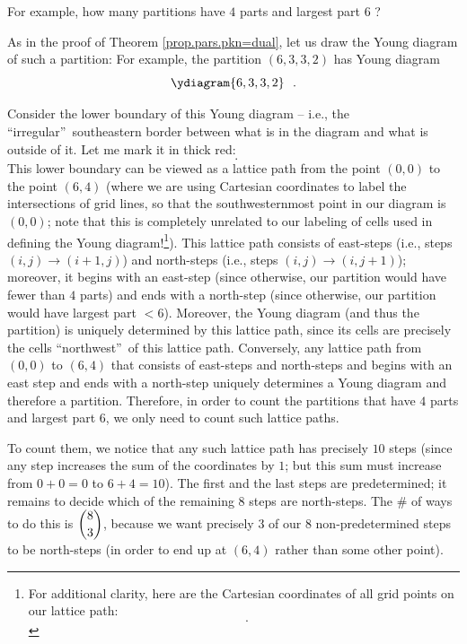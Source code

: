 For example, how many partitions have $4$ parts and largest part $6$ ?

As in the proof of Theorem \ref{prop.pars.pkn=dual}, let us draw the Young
diagram of such a partition: For example, the partition $\left(
6,3,3,2\right)  $ has Young diagram%
\[
\ydiagram{6,3,3,2}\ \ .
\]


Consider the lower boundary of this Young diagram -- i.e., the
\textquotedblleft irregular\textquotedblright\ southeastern border between
what is in the diagram and what is outside of it. Let me mark it in thick red:%
\[%
\ \ .
\]
This lower boundary can be viewed as a lattice path from the point $\left(
0,0\right)  $ to the point $\left(  6,4\right)  $ (where we are using
Cartesian coordinates to label the intersections of grid lines, so that the
southwesternmost point in our diagram is $\left(  0,0\right)  $; note that
this is completely unrelated to our labeling of cells used in defining the
Young diagram!\footnote{For additional clarity, here are the Cartesian
coordinates of all grid points on our lattice path:%
\[%
\ \ .
\]
}). This lattice path consists of east-steps (i.e., steps $\left(  i,j\right)
\rightarrow\left(  i+1,j\right)  $) and north-steps (i.e., steps $\left(
i,j\right)  \rightarrow\left(  i,j+1\right)  $); moreover, it begins with an
east-step (since otherwise, our partition would have fewer than $4$ parts) and
ends with a north-step (since otherwise, our partition would have largest part
$<6$). Moreover, the Young diagram (and thus the partition) is uniquely
determined by this lattice path, since its cells are precisely the cells
\textquotedblleft northwest\textquotedblright\ of this lattice path.
Conversely, any lattice path from $\left(  0,0\right)  $ to $\left(
6,4\right)  $ that consists of east-steps and north-steps and begins with an
east step and ends with a north-step uniquely determines a Young diagram and
therefore a partition. Therefore, in order to count the partitions that have
$4$ parts and largest part $6$, we only need to count such lattice paths.

To count them, we notice that any such lattice path has precisely $10$ steps
(since any step increases the sum of the coordinates by $1$; but this sum must
increase from $0+0=0$ to $6+4=10$). The first and the last steps are
predetermined; it remains to decide which of the remaining $8$ steps are
north-steps. The \# of ways to do this is $\dbinom{8}{3}$, because we want
precisely $3$ of our $8$ non-predetermined steps to be north-steps (in order
to end up at $\left(  6,4\right)  $ rather than some other point).

